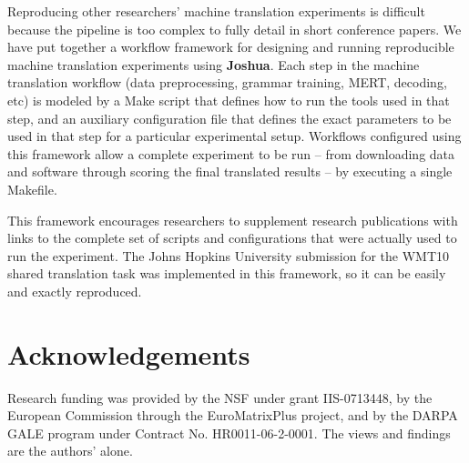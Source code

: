 \documentclass[11pt]{article}
\newcommand{\joshua}{\textbf{Joshua}\xspace}
\begin{document}
Reproducing other researchers' machine translation experiments is difficult
because the pipeline is too complex to fully detail in short conference papers.
We have put together a workflow framework for designing and running
reproducible machine translation experiments using \joshua \cite{Schwartz-wmt10-pipline}.
Each step in the machine translation workflow (data preprocessing, grammar
training, MERT, decoding, etc) is modeled by a Make script that defines how to
run the tools used in that step, and an auxiliary configuration file that
defines the exact parameters to be used in that step for a particular
experimental setup. Workflows configured using this framework allow a complete
experiment to be run -- from downloading data and software through scoring the
final translated results -- by executing a single Makefile.

This framework encourages researchers to supplement research publications with
links to the complete set of scripts and configurations that were actually used
to run the experiment. The Johns Hopkins University submission for the WMT10
shared translation task was implemented in this framework, so it can be easily
and exactly reproduced.


\section*{Acknowledgements}

Research funding was provided by the NSF under grant IIS-0713448, by the European Commission through the EuroMatrixPlus project, and by the DARPA GALE program under Contract No. HR0011-06-2-0001. The views and findings are the authors' alone.




\end{document}
